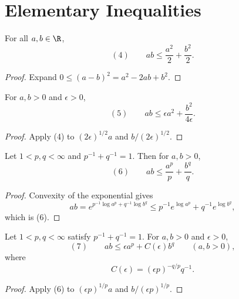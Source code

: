 \section{Elementary Inequalities}
\label{sec:elementary-inequalities}

\begin{lemma}
\label{lem:cauchys-inequality}
For all $a,b\in\R$,
\[
(4)\qquad ab\leq\frac{a^2}{2}+\frac{b^2}{2}.
\]
\end{lemma}
\begin{proof}
\sketch Expand $0\leq(a-b)^2=a^2-2ab+b^2$.
\end{proof}

\begin{lemma}
\label{lem:cauchys-inequality-epsilon}
For $a,b>0$ and $\epsilon>0$,
\[
(5)\qquad
ab\leq\epsilon a^2+\frac{b^2}{4\epsilon}.
\]
\end{lemma}
\begin{proof}
\sketch Apply (4) to $(2\epsilon)^{1/2}a$ and $b/(2\epsilon)^{1/2}$.
\end{proof}

\begin{lemma}
\label{lem:youngs-inequality}
Let $1<p,q<\infty$ and $p^{-1}+q^{-1}=1$. Then for $a,b>0$,
\[
(6)\qquad ab\leq\frac{a^p}{p}+\frac{b^q}{q}.
\]
\end{lemma}
\begin{proof}
\sketch Convexity of the exponential gives
\[
ab=e^{p^{-1}\log a^p+q^{-1}\log b^q}
\leq p^{-1}e^{\log a^p}+q^{-1}e^{\log b^q},
\]
which is (6).
\end{proof}

\begin{lemma}
\label{lem:youngs-inequality-epsilon}
Let $1<p,q<\infty$ satisfy $p^{-1}+q^{-1}=1$. For $a,b>0$ and $\epsilon>0$,
\[
(7)\qquad
ab\leq\epsilon a^p+C(\epsilon)b^q
\qquad(a,b>0),
\]
where
\[
C(\epsilon)=(\epsilon p)^{-q/p}q^{-1}.
\]
\end{lemma}
\begin{proof}
\sketch Apply (6) to $(\epsilon p)^{1/p}a$ and $b/(\epsilon p)^{1/p}$.
\end{proof}


